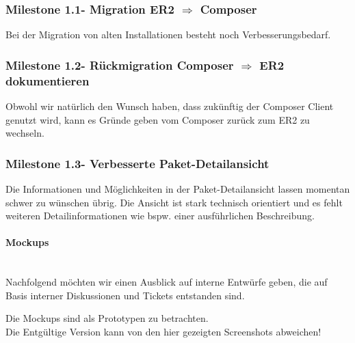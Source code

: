 \documentclass[
paper=a4,
draft=false,%
fontsize=10pt%
]{scrartcl}
\begin{document}
\subsubsection[Milestone 1.1 - Migration ER2 $ \Rightarrow $ Composer]{Milestone 1.1\footnotemark - Migration ER2 $ \Rightarrow $ Composer}
\label{subsec:ccc-milestone-1.1}

Bei der Migration von alten Installationen besteht noch Verbesserungsbedarf.

\subsubsection[Milestone 1.2 - Rückmigration Composer $ \Rightarrow $ ER2 dokumentieren]{Milestone 1.2\footnotemark - Rückmigration Composer $ \Rightarrow $ ER2 dokumentieren}
\label{subsec:ccc-milestone-1.2}

Obwohl wir natürlich den Wunsch haben, dass zukünftig der Composer Client genutzt wird, kann es Gründe geben vom Composer zurück zum ER2 zu wechseln.

\subsubsection[Milestone 1.3 - Verbesserte Paket-Detailansicht]{Milestone 1.3\footnotemark - Verbesserte Paket-Detailansicht}
\label{subsec:ccc-milestone-1.3}

Die Informationen und Möglichkeiten in der Paket-Detailansicht lassen momentan schwer zu wünschen übrig. Die Ansicht ist stark technisch orientiert und es fehlt weiteren Detailinformationen wie bspw. einer ausführlichen Beschreibung.

\paragraph{Mockups} ~\\
Nachfolgend möchten wir einen Ausblick auf interne Entwürfe geben, die auf Basis interner Diskussionen und Tickets entstanden sind.

\begin{danger}
Die Mockups sind als Prototypen zu betrachten. \\
Die Entgültige Version kann von den hier gezeigten Screenshots abweichen!
\end{danger}
\end{document}
